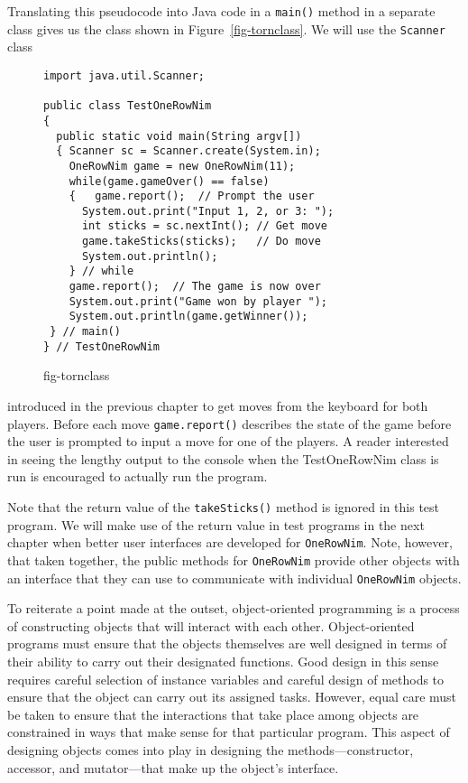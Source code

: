 \noindent  Translating this pseudocode into Java code in a {\tt main()}
method in a separate class gives us the class shown in
Figure~\ref{fig-tornclass}.  We will use the {\tt Scanner} class 
\begin{figure}[hbt]
\jjjprogstart
\begin{jjjlisting}
\begin{lstlisting}
import java.util.Scanner;  
  
public class TestOneRowNim
{
  public static void main(String argv[])
  { Scanner sc = Scanner.create(System.in);
    OneRowNim game = new OneRowNim(11);
    while(game.gameOver() == false) 
    {   game.report();  // Prompt the user
      System.out.print("Input 1, 2, or 3: ");
      int sticks = sc.nextInt(); // Get move
      game.takeSticks(sticks);   // Do move
      System.out.println();
    } // while
    game.report();  // The game is now over
    System.out.print("Game won by player ");
    System.out.println(game.getWinner());
 } // main()
} // TestOneRowNim
\end{lstlisting}
\end{jjjlisting}
{fig-tornclass}
\end{figure}
introduced in the previous chapter to get moves from the keyboard
for both players.  Before each move {\tt game.report()} describes 
the state of the game before the user is prompted to input a move 
for one of the players.  A reader interested in
seeing the lengthy output to the console when the {TestOneRowNim}
class is run is encouraged to actually run the program.

Note that the return value of the {\tt takeSticks()} method is ignored
in this test program.  We will make use of the return value in test
programs in the next chapter when better user interfaces are developed
for {\tt OneRowNim}.  Note, however, that taken together, the public
methods for {\tt OneRowNim} provide other objects with an interface
that they can use to communicate with individual {\tt OneRowNim}
objects.


\noindent To reiterate a point made at the outset, object-oriented programming
is a process of constructing objects that will interact with each
other.  Object-oriented programs must ensure that the objects
themselves are well designed in terms of their ability to carry out
their designated functions.  Good design in this sense requires
careful selection of instance variables and careful design of methods
to ensure that the object can carry out its assigned tasks.  However,
equal care must be taken to ensure that the interactions that take
place among objects are constrained in ways that make sense for that
particular program.  This aspect of designing objects comes into play
in designing the methods---constructor, accessor, and mutator---that
make up the object's interface.

